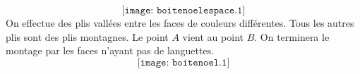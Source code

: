 \[\texttt{[image: boitenoelespace.1]}\]
On effectue des plis vallées entre les faces de couleurs différentes. Tous les autres plis sont des plis montagnes. Le point $A$ vient au point $B$. On terminera le montage par les faces n'ayant pas de languettes.
\[\texttt{[image: boitenoel.1]}\]